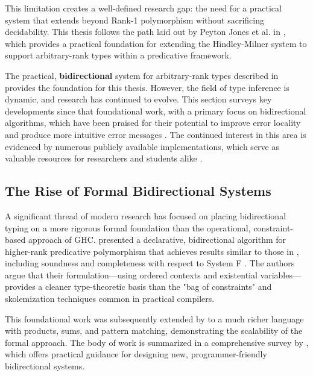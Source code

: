 This limitation creates a well-defined research gap: the need for a practical system that extends beyond Rank-1 polymorphism without sacrificing decidability. This thesis follows the path laid out by Peyton Jones et al. in \cite{jones-practical-2007}, which provides a practical foundation for extending the Hindley-Milner system to support arbitrary-rank types within a predicative framework.


\label{chap:LiteratureReview:sec:TypeInferenceAlgorithm}

The practical, \textbf{bidirectional} system for arbitrary-rank types described in \cite{jones-practical-2007} provides the foundation for this thesis. However, the field of type inference is dynamic, and research has continued to evolve. This section surveys key developments since that foundational work, with a primary focus on bidirectional algorithms, which have been praised for their potential to improve error locality and produce more intuitive error messages \cite{dunfield-bidirectional-2020}. The continued interest in this area is evidenced by numerous publicly available implementations, which serve as valuable resources for researchers and students alike \cite{github-goldenberg-artem-goldenbergbidirectionalsystem-2025, github-choi-kwanghoonbidi-2025, github-chen-cu1ch3ntype-inference-zoo-2025}.

\subsection{The Rise of Formal Bidirectional Systems}

A significant thread of modern research has focused on placing bidirectional typing on a more rigorous formal foundation than the operational, constraint-based approach of GHC. \citeauthor{dunfield-complete-2013} \cite{dunfield-complete-2013} presented a declarative, bidirectional algorithm for higher-rank predicative polymorphism that achieves results similar to those in \cite{jones-practical-2007}, including soundness and completeness with respect to System F \cite{selinger-lecture-2013}. The authors argue that their formulation—using ordered contexts and existential variables—provides a cleaner type-theoretic basis than the "bag of constraints" and skolemization techniques common in practical compilers.

This foundational work was subsequently extended by \citeauthor{dunfield-sound-2019} \cite{dunfield-sound-2019} to a much richer language with products, sums, and pattern matching, demonstrating the scalability of the formal approach. The body of work is summarized in a comprehensive survey by \citeauthor{dunfield-bidirectional-2020} \cite{dunfield-bidirectional-2020}, which offers practical guidance for designing new, programmer-friendly bidirectional systems.

